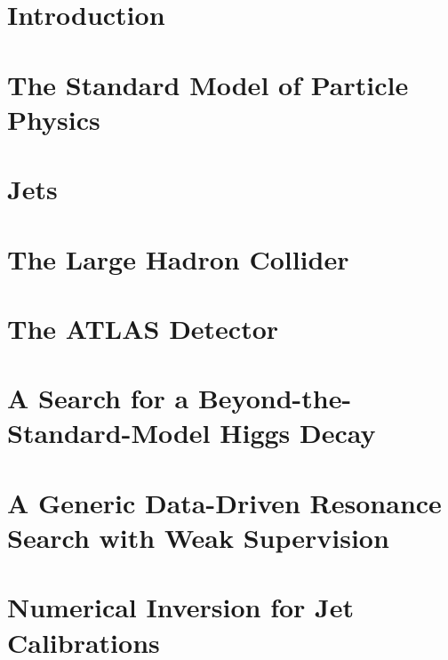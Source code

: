 \documentclass[12pt]{report}
\begin{document}
%
%


\chapter{Introduction}
\label{ch:intro}

\chapter{The Standard Model of Particle Physics}
\label{ch:SM}

\chapter{Jets}
\label{ch:Jets}

\chapter{The Large Hadron Collider}
\label{ch:LHC}

\chapter{The ATLAS Detector}
\label{ch:ATLAS}

\chapter{A Search for a Beyond-the-Standard-Model Higgs Decay}
\label{ch:HBSM}

\chapter{A Generic Data-Driven Resonance Search with Weak Supervision}
\label{ch:CWoLa}

\chapter{Numerical Inversion for Jet Calibrations}
\label{ch:NI}
\end{document}
